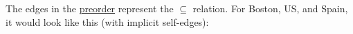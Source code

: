 The edges in the \href{doc/1 math/Seven Sketches in Compositionality/Chapter 1: Generative Effects/3 Preorders/1 Preorder}{preorder} represent the $\subseteq$ relation. For Boston, US, and Spain, it would look like this (with implicit self-edges): 
